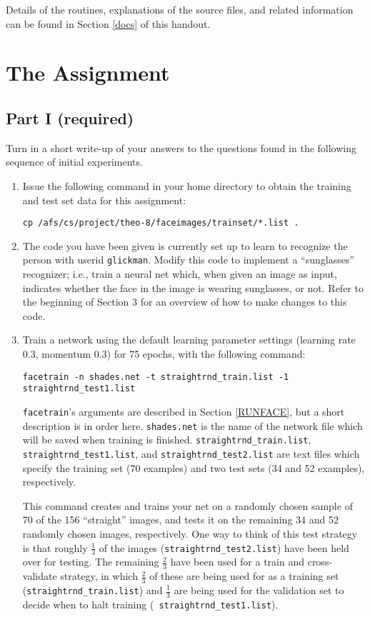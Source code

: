 Details of the routines, explanations of the source files, and related
information can be found in Section \ref{docs} of this handout.

\section{The Assignment}

\subsection{Part I (required)}

Turn in a short write-up of your answers to the questions found in the
following sequence of initial experiments.

\begin{enumerate}

\item Issue the following command in your home directory to obtain
the training and test set data for this assignment:

{\tt cp /afs/cs/project/theo-8/faceimages/trainset/*.list .}

\item The code you have been given is currently set up to learn to recognize
the person with userid {\tt glickman}.  Modify this code to implement a
``sunglasses'' recognizer; i.e., train a neural net which, when given an image
as input, indicates whether the face in the image is wearing sunglasses, or
not. Refer to the beginning of Section 3 for an overview of how to
make changes to this code.

\item Train a network using the default learning parameter settings (learning
rate 0.3, momentum 0.3) for 75 epochs, with the following command:

{\tt facetrain -n shades.net -t straightrnd\_train.list -1 straightrnd\_test1.list}

{\tt facetrain}'s arguments are described in Section \ref{RUNFACE},
but a short description is in order here.  {\tt shades.net} is the name of
the network file which will be saved when training is finished.
{\tt straightrnd\_train.list}, {\tt straightrnd\_test1.list}, and
{\tt straightrnd\_test2.list} are text files which specify the training
set (70 examples) and two test sets (34 and 52 examples), respectively.

This command creates and trains your net on a randomly chosen sample of 70 of
the 156 ``straight'' images, and tests it on the remaining 34 and 52 randomly
chosen images, respectively.  One way to think of this test strategy is that
roughly $\frac{1}{3}$ of the images ({\tt straightrnd\_test2.list}) have been
held over for testing.  The remaining $\frac{2}{3}$ have been used for a train
and cross-validate strategy, in which $\frac{2}{3}$ of these are being used
for as a training set ({\tt straightrnd\_train.list}) and $\frac{1}{3}$ are
being used for the validation set to decide when to halt training ({\tt
straightrnd\_test1.list}).


\end{enumerate}
